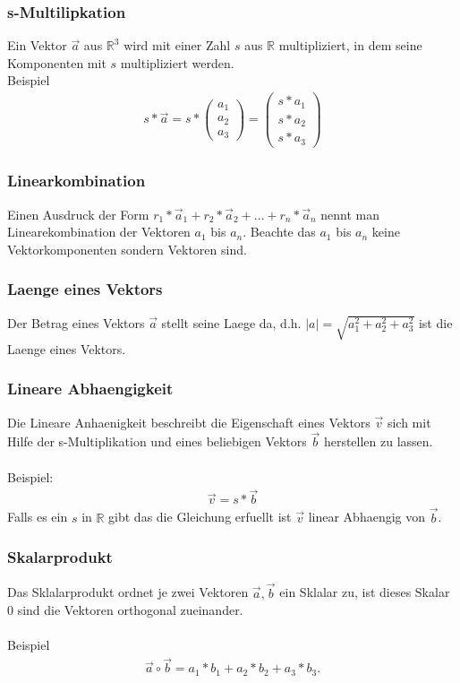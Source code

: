 \documentclass[a4paper]{article} %
\begin{document}
	\subsubsection{s-Multilipkation}
	Ein Vektor $\vec{a}$ aus $\mathbb{R}^3$  wird mit einer Zahl $s$ aus $\mathbb{R}$ multipliziert, in dem seine Komponenten mit $s$ multipliziert werden.\\Beispiel
	\begin{align*}  s*\vec{a}=s*\begin{pmatrix}a_1\\a_2\\a_3\end{pmatrix}=\begin{pmatrix}s*a_1\\s*a_2\\s*a_3\end{pmatrix} \end{align*}
	\subsubsection{Linearkombination}
	Einen Ausdruck der Form $r_1*\vec{a}_1 + r_2*\vec{a}_2 + \hdots + r_n*\vec{a}_n $ nennt man Linearekombination der Vektoren $a_1$ bis $a_n$.
	Beachte das $a_1$ bis $a_n$ keine Vektorkomponenten sondern Vektoren sind.
	\subsubsection{Laenge eines Vektors}
	Der Betrag eines Vektors $\vec{a}$ stellt seine Laege da, d.h. $|a|=\sqrt{a_1^2+a_2^2+a_3^2}$ ist die Laenge eines Vektors.
	\subsubsection{Lineare Abhaengigkeit}
	Die Lineare Anhaenigkeit beschreibt die Eigenschaft eines Vektors $\vec{v}$ sich mit Hilfe der s-Multiplikation und eines beliebigen Vektors $\vec{b}$ herstellen zu lassen.
	\\\\Beispiel:
	\begin{align*} \vec{v}=s*\vec{b} \end{align*}
	Falls es ein $s$ in $\mathbb{R}$ gibt das die Gleichung erfuellt ist $\vec{v}$ linear Abhaengig von $\vec{b}$.
	\subsubsection{Skalarprodukt}
	Das Sklalarprodukt ordnet je zwei Vektoren $\vec{a},\vec{b}$ ein Sklalar zu, ist dieses Skalar $0$ sind die Vektoren orthogonal zueinander.\\\\Beispiel  \begin{align*} \vec{a} \circ \vec{b}=a_1*b_1+a_2*b_2+a_3*b_3. \end{align*}
\end{document}
